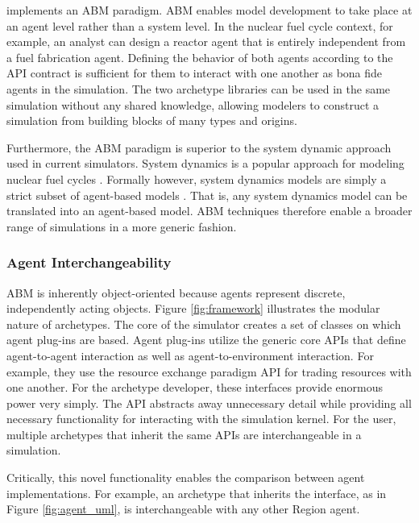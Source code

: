 \Cyclus implements an \acrlong{ABM} paradigm. \gls{ABM} enables model
development to take place at an agent level rather than a system level. In the
nuclear fuel cycle context, for example, an analyst can design a reactor agent
that is entirely independent from a fuel fabrication agent. Defining the
behavior of both agents according to the
\gls{API} contract is sufficient for them to interact with one another as
bona fide agents in the simulation.  The two archetype libraries can be used in
the same simulation without any shared knowledge, allowing modelers to
construct a simulation from building blocks of many types and origins.

Furthermore, the \gls{ABM} paradigm is superior to the system dynamic approach used in
current simulators.
System dynamics is a popular approach for modeling nuclear fuel cycles
\cite{jacobson_vision_2009,van_den_durpel_daness_2009,guerin_impact_2009,guerin_benchmark_2009}.
Formally however, system dynamics models are simply a strict subset of agent-based models
\cite{macal_agent-based_2010}.
That is, any system dynamics model can be translated
into an agent-based model.
\gls{ABM} techniques therefore enable a broader range of simulations in a more
generic fashion.

\subsubsection{Agent Interchangeability}\label{sec:interchangeability}


\gls{ABM} is inherently object-oriented because agents represent discrete,
independently acting objects.  Figure \ref{fig:framework} illustrates the
modular nature of \Cyclus archetypes.  The core of the \Cyclus simulator creates
a set of classes on which agent plug-ins are based.  Agent plug-ins utilize the
generic core \glspl{API} that define agent-to-agent interaction as well as agent-to-environment interaction.
For example, they use the
resource exchange paradigm \gls{API} for trading resources with one another.  
For the archetype developer, these interfaces provide enormous power
very simply. The \gls{API} abstracts away unnecessary detail while providing
all necessary functionality for interacting with the \Cyclus simulation kernel.
For the user, multiple archetypes that inherit the same \glspl{API} are interchangeable
in a simulation.

Critically, this novel functionality enables the comparison
between agent implementations. For example, 
an archetype that inherits the  interface, as in Figure
\ref{fig:agent_uml}, is interchangeable with any other Region agent.


